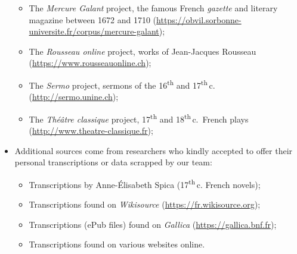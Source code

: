 \begin{itemize}
\begin{itemize}
              \item The \emph{Mercure Galant} project, the famous French \emph{gazette} and literary magazine between 1672 and 1710 (\url{https://obvil.sorbonne-universite.fr/corpus/mercure-galant});
              \item The \emph{Rousseau online} project, works of Jean-Jacques Rousseau (\url{https://www.rousseauonline.ch});
              \item The \emph{Sermo} project, sermons of the 16\textsuperscript{th} and 17\textsuperscript{th}\,c. (\url{http://sermo.unine.ch});
              \item The \emph{Théâtre classique} project, 17\textsuperscript{th} and 18\textsuperscript{th}\,c.~French plays (\url{http://www.theatre-classique.fr});
          \end{itemize}
    \item Additional sources come from researchers who kindly accepted to offer their personal transcriptions or data scrapped by our team:
          \begin{itemize}
              \item Transcriptions by Anne-Élisabeth Spica (17\textsuperscript{th}\,c. French novels);
              \item Transcriptions found on \emph{Wikisource} (\url{https://fr.wikisource.org});
              \item Transcriptions (ePub files) found on \emph{Gallica} (\url{https://gallica.bnf.fr});
              \item Transcriptions found on various websites online.
          \end{itemize}
\end{itemize}


